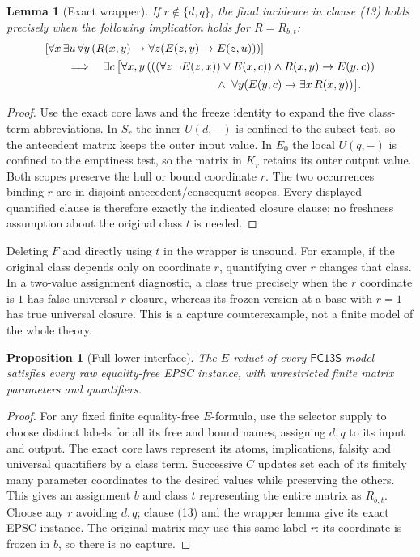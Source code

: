 \documentclass[11pt]{article}
\newtheorem{lemma}[theorem]{Lemma}
\newtheorem{proposition}[theorem]{Proposition}
\newcommand{\FC}{\ensuremath{\mathsf{FC13S}}}
\begin{document}
\begin{lemma}[Exact wrapper]
If $r\notin\{d,q\}$, the final incidence in clause (13) holds precisely
when the following implication holds for $R=R_{b,t}$:
\begin{align*}
 &[\forall x\,\exists u\,\forall y\,
       (R(x,y)\to\forall z(E(z,y)\to E(z,u)))]\\
 &\qquad\Longrightarrow\quad
 \exists c\,\bigl[\forall x,y\,
       (((\forall z\,\neg E(z,x))\lor E(x,c))\land R(x,y)
         \to E(y,c))\\
 &\hspace{53mm}\land\ \forall y(E(y,c)\to\exists x\,R(x,y))\bigr].
\end{align*}
\end{lemma}
\begin{proof}
Use the exact core laws and the freeze identity to expand the five
class-term abbreviations.  In $S_r$ the inner $U(d,-)$ is confined to the
subset test, so the antecedent matrix keeps the outer input value.
In $E_0$ the local $U(q,-)$ is confined to the emptiness test, so the matrix
in $K_r$ retains its outer output value.  Both scopes preserve the hull or
bound coordinate $r$.  The two occurrences binding $r$ are in disjoint
antecedent/consequent scopes.  Every displayed quantified clause is
therefore exactly the indicated closure clause; no freshness assumption
about the original class $t$ is needed.
\end{proof}

Deleting $F$ and directly using $t$ in the wrapper is unsound.  For example,
if the original class depends only on coordinate $r$, quantifying over $r$
changes that class.  In a two-value assignment diagnostic, a class true
precisely when the $r$ coordinate is $1$ has false universal $r$-closure,
whereas its frozen version at a base with $r=1$ has true universal closure.
This is a capture counterexample, not a finite model of the whole theory.

\begin{proposition}[Full lower interface]
The $E$-reduct of every $\FC$ model satisfies every raw equality-free EPSC
instance, with unrestricted finite matrix parameters and quantifiers.
\end{proposition}
\begin{proof}
For any fixed finite equality-free $E$-formula, use the selector supply to
choose distinct labels for all its free and bound names, assigning $d,q$
to its input and output.  The exact core laws represent its atoms,
implications, falsity and universal quantifiers by a class term.
Successive $C$ updates set each of its finitely many parameter coordinates
to the desired values while preserving the others.  This gives an
assignment $b$ and class $t$ representing the entire matrix as $R_{b,t}$.
Choose any $r$ avoiding $d,q$; clause (13) and the wrapper lemma give its
exact EPSC instance.  The original matrix may use this same label $r$:
its coordinate is frozen in $b$, so there is no capture.
\end{proof}
\end{document}
